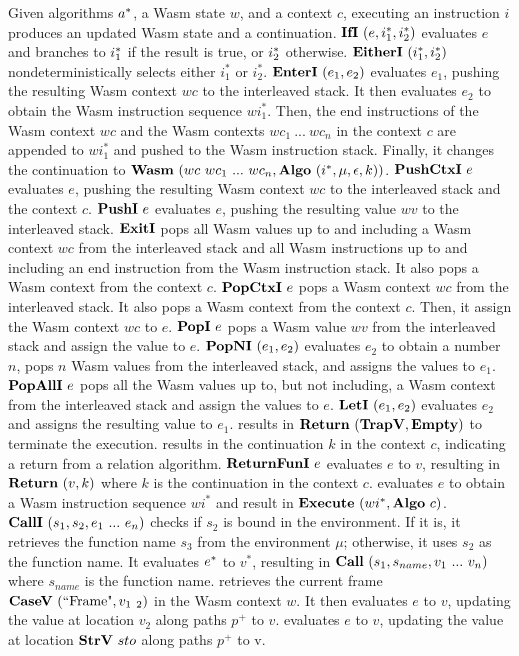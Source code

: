 Given algorithms $a^*$, a Wasm state $w$, and a context $c$, executing an
instruction $i$ produces an updated Wasm state and a continuation.
$\textbf{IfI} ~ (e, i_1^*, i_2^*)${} evaluates $e$ and branches to $i^*_1$ if the
result is true, or $i^*_2$ otherwise.
$\textbf{EitherI} ~ (i_1^*, i_2^*)${} nondeterministically selects either $i_1^*$ or
$i_2^*$.
$\textbf{EnterI} ~ (e_1, e_2)${} evaluates $e_1$, pushing the resulting Wasm context
$wc$ to the interleaved stack.
It then evaluates $e_2$ to obtain the Wasm instruction sequence $wi_1^*$.
Then, the end instructions of the Wasm context $wc$ and the Wasm contexts
$wc_1 ~ ... ~ wc_n$ in the context $c$ are appended to $wi_1^*$ and pushed to
the Wasm instruction stack.
Finally, it changes the continuation to
$\textbf{Wasm} ~ (wc ~ wc_1 ~ ... ~ wc_n, \textbf{Algo} ~ (i^*, \mu, \epsilon, k))${}.
$\textbf{PushCtxI} ~ e${} evaluates $e$, pushing the resulting Wasm context $wc$ to the
interleaved stack and the context $c$.
$\textbf{PushI} ~ e${} evaluates $e$, pushing the resulting value $wv$ to the
interleaved stack.
$\textbf{ExitI}${} pops all Wasm values up to and including a Wasm context $wc$ from
the interleaved stack and all Wasm instructions up to and including an end
instruction from the Wasm instruction stack.
It also pops a Wasm context from the context $c$.
$\textbf{PopCtxI} ~ e${} pops a Wasm context $wc$ from the interleaved stack.
It also pops a Wasm context from the context $c$.
Then, it assign the Wasm context $wc$ to $e$.
$\textbf{PopI} ~ e${} pops a Wasm value $wv$ from the interleaved stack and assign the
value to $e$.
$\textbf{PopNI} ~ (e_1, e_2)${} evaluates $e_2$ to obtain a number $n$, pops $n$ Wasm
values from the interleaved stack, and assigns the values to $e_1$.
$\textbf{PopAllI} ~ e${} pops all the Wasm values up to, but not including, a
Wasm context from the interleaved stack and assign the values to $e$.
$\textbf{LetI} ~ (e_1, e_2)${} evaluates $e_2$ and assigns the resulting value to
$e_1$.
\trapi{} results in $\textbf{Return} ~ (\textbf{TrapV}{}, \textbf{Empty}{})$ to terminate the execution.
\returnreli{} results in the continuation $k$ in the context $c$, indicating a
return from a relation algorithm.
$\textbf{ReturnFunI} ~ e${} evaluates $e$ to $v$, resulting in $\textbf{Return} ~ (v, k)${} where
$k$ is the continuation in the context $c$.
\executei{} evaluates $e$ to obtain a Wasm instruction sequence $wi^*$ and
result in $\textbf{Execute} ~ (wi^*, \textbf{Algo} ~ c)${}.
$\textbf{CallI} ~ (s_1, s_2, e_1 ~ ... ~ e_n)${} checks if $s_2$ is bound in the
environment.
If it is, it retrieves the function name $s_3$ from the environment $\mu$;
otherwise, it uses $s_2$ as the function name.
It evaluates $e^*$ to $v^*$, resulting in $\textbf{Call} ~ (s_1, s_{name}, v_1 ~ ...
~ v_n)${} where $s_{name}$ is the function name.
\replaceframei{} retrieves the current frame $\textbf{CaseV} ~ (\text{``Frame"}, v_1 ~
_2)${} in the Wasm context $w$.
It then evaluates $e$ to $v$, updating the value at location $v_2$ along paths
$p^+$ to $v$.
\replacestorei{} evaluates $e$ to $v$, updating the value at location $\textbf{StrV} ~
sto$ along paths $p^+$ to v.




